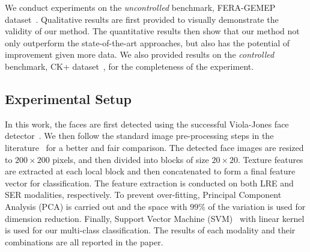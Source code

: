 \documentclass[journal]{IEEEtran}
\begin{document}
We conduct experiments on the \textit{uncontrolled} benchmark, FERA-GEMEP dataset~\cite{FERA_data}. Qualitative results are first provided to visually demonstrate the validity of our method. The quantitative results then show that our method not only outperform the state-of-the-art approaches, but also has the potential of improvement given more data. We also provided results on the \textit{controlled} benchmark, CK+ dataset~\cite{CKplus}, for the completeness of the experiment.

\subsection{Experimental Setup}

In this work, the faces are first detected using the successful Viola-Jones face detector~\cite{Viola_IJCV04}. We then follow the standard image pre-processing steps in the literature~\cite{Valstar12}\cite{Yang_SMCB12} for a better and fair comparison. The detected face images are resized to $200\times200$ pixels, and then divided into blocks of size $20\times20$. Texture features are extracted at each local block and then concatenated to form a final feature vector for classification. The feature extraction is conducted on both LRE and SER modalities, respectively. To prevent over-fitting, Principal Component Analysis (PCA) is carried out and the space with $99\%$ of the variation is used for dimension reduction. Finally, Support Vector Machine (SVM)~\cite{libsvm} with linear kernel is used for our multi-class classification. The results of each modality and their combinations are all reported in the paper. 
\end{document}
